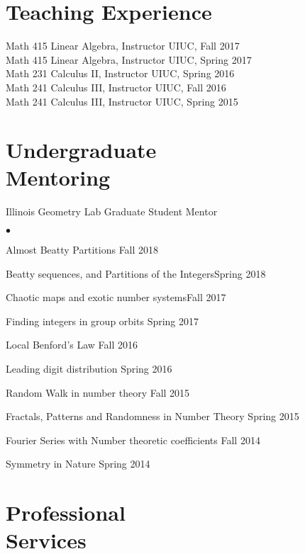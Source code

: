 \documentclass[margin,line,pifont,palatino,courier]{res}
\newenvironment{list1}{
  \begin{list}{\ding{113}}{%
      \setlength{\itemsep}{0in}
      \setlength{\parsep}{0in} \setlength{\parskip}{0in}
      \setlength{\topsep}{0in} \setlength{\partopsep}{0in}
      \setlength{\leftmargin}{0.17in}}}{\end{list}}
\newenvironment{list2}{
  \begin{list}{$\bullet$}{%
      \setlength{\itemsep}{0in}
      \setlength{\parsep}{0in} \setlength{\parskip}{0in}
      \setlength{\topsep}{0in} \setlength{\partopsep}{0in}
      \setlength{\leftmargin}{0.2in}}}{\end{list}}
\begin{document}
\begin{resume}
\section{\sc Teaching Experience}
Math 415 Linear Algebra, Instructor {\hfill  UIUC, Fall 2017}\\
Math 415 Linear Algebra, Instructor {\hfill  UIUC, Spring 2017}\\
Math 231 Calculus II, Instructor {\hfill  UIUC, Spring 2016}\\
Math 241 Calculus III, Instructor {\hfill  UIUC, Fall 2016} \\
Math 241 Calculus III, Instructor {\hfill  UIUC, Spring 2015}


\section{\sc Undergraduate \\Mentoring}
\begin{list1}
	\item{Illinois Geometry Lab Graduate Student Mentor}
	\begin{list2}
		\item Almost Beatty Partitions {\hfill  Fall 2018}
		\item Beatty sequences, and Partitions of the Integers{\hfill  Spring 2018}
		\item Chaotic maps and exotic number systems{\hfill  Fall 2017}
		\item Finding integers in group orbits {\hfill  Spring 2017}
		\item Local Benford's Law {\hfill  Fall 2016} 
		\item Leading digit distribution {\hfill  Spring 2016} 
		\item Random Walk in number theory {\hfill  Fall 2015} 
		\item Fractals, Patterns and Randomness in Number Theory {\hfill Spring 2015} 
		\item Fourier Series with Number theoretic coefficients {\hfill  Fall 2014} 
		\item Symmetry in Nature {\hfill Spring 2014}
	\end{list2}
\end{list1}

\section{\sc Professional \\Services}


\end{resume}
\end{document}
